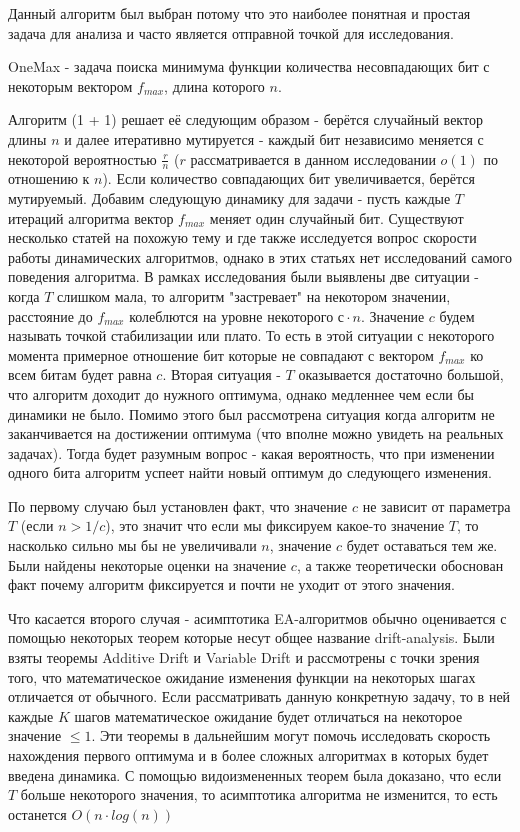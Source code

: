 \documentclass[times]{itmo-student-thesis}
\begin{document}
    Данный алгоритм был выбран потому что это наиболее понятная и простая задача для анализа и часто является отправной точкой для исследования.

    OneMax - задача поиска минимума функции количества несовпадающих бит с некоторым вектором $f_{max}$, длина которого $n$.

    Алгоритм (1 + 1) решает её следующим образом - берётся случайный вектор длины $n$ и далее итеративно мутируется - каждый бит независимо меняется с некоторой вероятностью $\frac{r}{n}$ ($r$ рассматривается в данном исследовании $o(1)$ по отношению к $n$).
    Если количество совпадающих бит увеличивается, берётся мутируемый.
    Добавим следующую динамику для задачи - пусть каждые $T$ итераций алгоритма вектор $f_{max}$ меняет один случайный бит.
    Существуют несколько статей на похожую тему  \cite{dinamically_1} и \cite{dinamically_2} где также исследуется вопрос скорости работы динамических алгоритмов, однако в этих статьях нет исследований самого поведения алгоритма.
    В рамках исследования были выявлены две ситуации - когда $T$ слишком мала, то алгоритм "застревает"  на некотором значении, расстояние до $f_{max}$ колеблются на уровне некоторого $с \cdot n$.
    Значение $c$ будем называть точкой стабилизации или плато.
    То есть в этой ситуации с некоторого момента примерное отношение бит которые не совпадают с вектором $f_{max}$ ко всем битам будет равна $c$.
    Вторая ситуация - $T$ оказывается достаточно большой, что алгоритм доходит до нужного оптимума, однако медленнее чем если бы динамики не было.
    Помимо этого был рассмотрена ситуация когда алгоритм не заканчивается на достижении оптимума (что вполне можно увидеть на реальных задачах).
    Тогда будет разумным вопрос - какая вероятность, что при изменении одного бита алгоритм успеет найти новый оптимум до следующего изменения.

    По первому случаю был установлен факт, что значение $c$ не зависит от параметра $T$ (если $n > 1/c$), это значит что если мы фиксируем какое-то значение $T$, то насколько сильно мы бы не увеличивали $n$, значение $c$ будет оставаться тем же.
    Были найдены некоторые оценки на значение $c$, а также теоретически обоснован факт почему алгоритм фиксируется и почти не уходит от этого значения.

    Что касается второго случая - асимптотика EA-алгоритмов обычно оценивается с помощью некоторых теорем которые несут общее название drift-analysis.
    Были взяты теоремы Additive Drift и Variable Drift и рассмотрены с точки зрения того, что математическое ожидание изменения функции на некоторых шагах отличается от обычного.
    Если рассматривать данную конкретную задачу, то в ней каждые $K$ шагов математическое ожидание будет отличаться на некоторое значение $\leq 1$.
    Эти теоремы в дальнейшим могут помочь исследовать скорость нахождения первого оптимума и в более сложных алгоритмах в которых будет введена динамика.
    С помощью видоизмененных теорем была доказано, что если $T$ больше некоторого значения, то асимптотика алгоритма не изменится, то есть останется $O(n \cdot log(n))$
\end{document}
